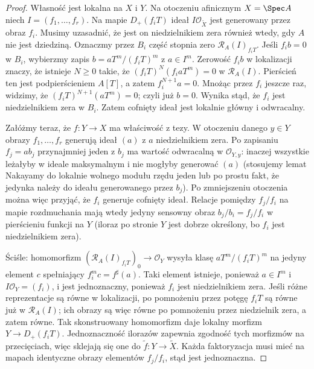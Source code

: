 \begin{proof}
Własność jest lokalna na $X$ i $Y$. Na otoczeniu
afinicznym $X=\Spec A$ niech $I=(f_1,\ldots,f_r)$.
Na mapie $D_+(f_iT)$ ideał $I\mathcal O_{\widetilde X}$
jest generowany przez obraz $f_i$. Musimy uzasadnić,
że jest on niedzielnikiem zera również wtedy, gdy $A$
nie jest dziedziną. Oznaczmy przez $B_i$ część stopnia
zero $\mathcal R_A(I)_{f_iT}$. Jeśli $f_i b=0$ w $B_i$,
wybierzmy zapis $b=aT^m/(f_iT)^m$ z $a\in I^m$.
Zerowość $f_i b$ w lokalizacji znaczy, że istnieje
$N\ge0$ takie, że $(f_iT)^N(f_i aT^m)=0$
w $\mathcal R_A(I)$. Pierścień ten jest podpierścieniem
$A[T]$, a zatem $f_i^{N+1}a=0$. Mnożąc przez $f_i$
jeszcze raz, widzimy, że $(f_iT)^{N+1}(aT^m)=0$;
czyli już $b=0$. Wynika stąd, że $f_i$ jest
niedzielnikiem zera w $B_i$. Zatem cofnięty ideał
jest lokalnie główny i odwracalny.

Załóżmy teraz, że $f:Y\to X$ ma właściwość z tezy.
W otoczeniu danego $y\in Y$ obrazy $f_1,\ldots,f_r$
generują ideał $(a)$ z $a$ niedzielnikiem zera.
Po zapisaniu $f_j=ab_j$ przynajmniej jeden z $b_j$
ma wartość odwracalną w $\mathcal O_{Y,y}$: inaczej
wszystkie leżałyby w ideale maksymalnym i nie mogłyby
generować $(a)$ (stosujemy lemat Nakayamy do lokalnie
wolnego modułu rzędu jeden lub po prostu fakt, że
jedynka należy do ideału generowanego przez $b_j$).
Po zmniejszeniu otoczenia można więc przyjąć, że
$f_i$ generuje cofnięty ideał. Relacje pomiędzy
$f_j/f_i$ na mapie rozdmuchania mają wtedy jedyny
sensowny obraz $b_j/b_i=f_j/f_i$ w pierścieniu
funkcji na $Y$ (iloraz po stronie $Y$ jest dobrze
określony, bo $f_i$ jest niedzielnikiem zera).

Ściśle: homomorfizm
$(\mathcal R_A(I)_{f_iT})_0\to\mathcal O_Y$
wysyła klasę $aT^m/(f_iT)^m$ na jedyny element
$c$ spełniający $f_i^m c=f^\sharp(a)$.
Taki element istnieje, ponieważ $a\in I^m$ i
$I\mathcal O_Y=(f_i)$, i jest jednoznaczny,
ponieważ $f_i$ jest niedzielnikiem zera.
Jeśli różne reprezentacje są równe w lokalizacji,
po pomnożeniu przez potęgę $f_iT$ są równe już w
$\mathcal R_A(I)$; ich obrazy są więc równe po
pomnożeniu przez niedzielnik zera, a zatem równe.
Tak skonstruowany homomorfizm daje lokalny morfizm
$Y\to D_+(f_iT)$. Jednoznaczność ilorazów zapewnia
zgodność tych morfizmów na przecięciach, więc
sklejają się one do $\widetilde f:Y\to\widetilde X$.
Każda faktoryzacja musi mieć na mapach identyczne
obrazy elementów $f_j/f_i$, stąd jest jednoznaczna.
\end{proof}


